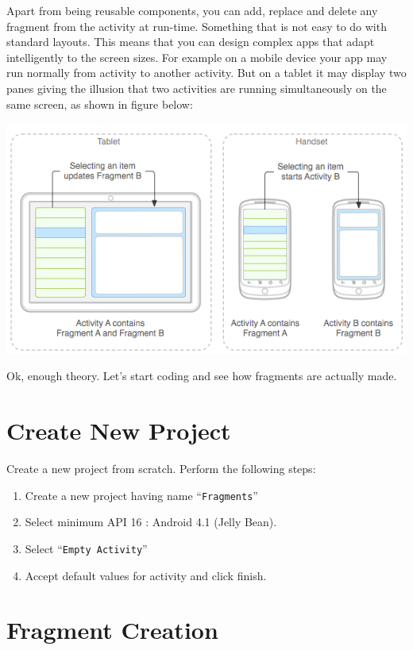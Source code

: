 Apart from being reusable components, you can add, replace and delete any fragment from the activity at run-time. Something that is not easy to do with standard layouts. This means that you can design complex apps that adapt intelligently to the screen sizes. For example on a mobile device your app may run normally from activity to another activity. But on a tablet it may display two panes giving the illusion that two activities are running simultaneously on the same screen, as shown in figure below:

\begin{center}
	\includegraphics[scale=0.4]{chapters/ch11/images/1}
\end{center}

Ok, enough theory. Let's start coding and see how fragments are actually made.

\section{Create New Project}
\label{FRAG:createProj}

Create a new project from scratch. Perform the following steps:
\begin{enumerate}
	\item Create a new project having name ``\texttt{Fragments}''
	\item Select minimum API 16 : Android 4.1 (Jelly Bean).
	\item Select ``\texttt{Empty Activity}''
	\item Accept default values for activity and click finish. \\
\end{enumerate}

\section{Fragment Creation}
\label{FRAG:fragmentCreation}


